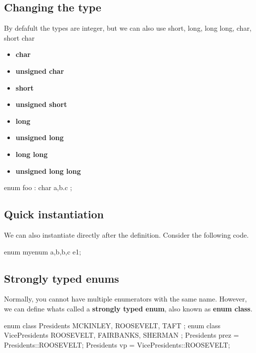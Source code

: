 \documentclass{report}
\begin{document}
    \subsection{Changing the type}
    \bigbreak \noindent 
    By defafult the types are integer, but we can also use short, long, long long, char, short char
    \begin{itemize}
        \item \textbf{char}
        \item \textbf{unsigned char}
        \item \textbf{short }
        \item \textbf{unsigned short}
        \item \textbf{long }
        \item \textbf{unsigned long}
        \item \textbf{long long}
        \item \textbf{unsigned long long}
    \end{itemize}
    \bigbreak \noindent 
    \begin{cppcode}
        enum foo : char {
            a,b.c
        };
    \end{cppcode}
    \bigbreak \noindent 
    \subsection{Quick instantiation}
    \bigbreak \noindent 
    We can also instantiate directly after the definition. Consider the following code.
    \begin{cppcode}
enum myenum {a,b,b,c} e1;
    \end{cppcode}
    

    \bigbreak \noindent 
    \subsection{Strongly typed enums}
    \bigbreak \noindent 
    Normally, you cannot have multiple enumerators with the same name. However, we can define whats called a \textbf{strongly typed enum}, also known as \textbf{enum class}.
    \bigbreak \noindent 
    
    \begin{cppcode}
enum class Presidents { MCKINLEY, ROOSEVELT, TAFT }; 
enum class VicePresidents { ROOSEVELT, FAIRBANKS, SHERMAN };
Presidents prez = Presidents::ROOSEVELT;
Presidents vp = VicePresidents::ROOSEVELT;
    \end{cppcode}
    
\end{document}
